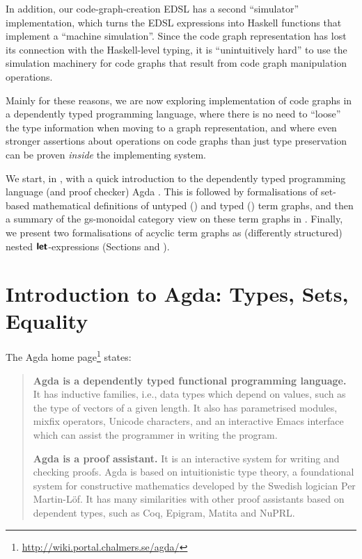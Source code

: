 \documentclass[copyright]{eptcs}
\newcommand\Keyword[1]{\textsf{\textbf{#1}}}
\newcounter{x}
\newcounter{y}
\begin{document}
In addition, our code-graph-creation EDSL has a second
``simulator'' implementation, which turns the EDSL expressions
into Haskell functions that implement a ``machine simulation''.
Since the code graph representation has lost its connection
with the Haskell-level typing,
it is ``unintuitively hard'' to use the simulation machinery
for code graphs that result from code graph manipulation operations.

Mainly for these reasons, we are now exploring implementation
of code graphs in a dependently typed programming language,
where there is no need to ``loose'' the type information
when moving to a graph representation,
and where even stronger assertions about operations on code graphs
than just type preservation can be proven \emph{inside} the
implementing system.

We start, in , with a quick introduction to
the dependently typed programming language
(and proof checker) Agda \cite{Norell-2007}.
This is followed by formalisations of set-based mathematical
definitions
of untyped () and typed () term
graphs,
and then a summary of the gs-monoidal category view on these term
graphs in .
Finally, we present two formalisations of acyclic term graphs
as (differently structured) nested \ensuremath{\Keyword{let}}-expressions
(Sections  and ).



\section{Introduction to Agda: Types, Sets, Equality}

The Agda home page\footnote{\url{http://wiki.portal.chalmers.se/agda/}} states:

\begin{quotation}
\textbf{Agda is a dependently typed functional programming language.} It has inductive families, i.e., data types which depend on values, such as the type of vectors of a given length. It also has parametrised modules, mixfix operators, Unicode characters, and an interactive Emacs interface which can assist the programmer in writing the program.

\textbf{Agda is a proof assistant.} It is an interactive system for writing and checking proofs. Agda is based on intuitionistic type theory, a foundational system for constructive mathematics developed by the Swedish logician Per Martin-Löf. It has many similarities with other proof assistants based on dependent types, such as Coq, Epigram, Matita and NuPRL. 
\end{quotation}
\end{document}
